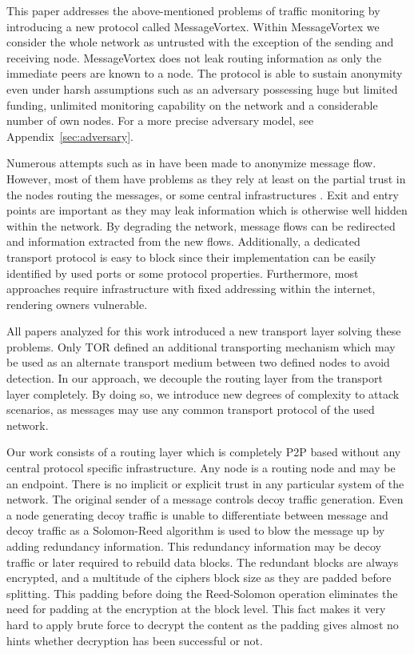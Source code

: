 \documentclass[runningheads]{llncs}
\begin{document}
This paper addresses the above-mentioned problems of traffic monitoring by introducing a new  protocol called MessageVortex. Within MessageVortex we consider the whole network as untrusted with the exception of the sending and receiving node. MessageVortex does not leak routing information as only the immediate peers are known to a node. The protocol is able to sustain anonymity\cite{anon_terminology} even under harsh assumptions such as an adversary possessing huge but limited funding, unlimited monitoring capability on the network and a considerable number of own nodes. For a more precise adversary model, see Appendix~\ref{sec:adversary}.

Numerous attempts such as in \cite{minion-design,babel,mixmaster-spec,tor-design,freehaven-berk,herbivore:tr} have been made to anonymize message flow. However, most of them have problems as they rely at least on the partial trust in the nodes routing the messages, or some central infrastructures \cite{hs-attack06,esorics13-cellflood,esorics12-torscan,oakland2013-trawling}. Exit and entry points are important as they may leak information which is otherwise well hidden within the network. By degrading the network, message flows can be redirected and information extracted from the new flows. Additionally, a dedicated transport protocol is easy to block since their implementation can be easily identified by used ports or some protocol properties. Furthermore, most approaches require infrastructure with fixed addressing within the internet, rendering owners vulnerable.

All papers analyzed for this work introduced a new transport layer solving these problems. Only TOR defined an additional transporting mechanism which may be used as an alternate transport medium between two defined nodes to avoid detection. In our approach, we decouple the routing layer from the transport layer completely. By doing so, we introduce new degrees of complexity to attack scenarios, as messages may use any common transport protocol of the used network. 

Our work consists of a routing layer which is completely P2P based without any central protocol specific infrastructure. Any node is a routing node and may be an endpoint. There is no implicit or explicit trust in any particular system of the  network. The original sender of a message controls decoy traffic generation. Even a node generating decoy traffic is unable to differentiate between message and decoy traffic as a Solomon-Reed algorithm is used to blow the message up by adding redundancy information. This redundancy information may be decoy traffic or later required to rebuild data blocks. The redundant blocks are always encrypted, and a multitude of the ciphers block size as they are padded before splitting. This padding before doing the Reed-Solomon operation eliminates the need for padding at the encryption at the block level. This fact makes it very hard to apply brute force to decrypt the content as the padding gives almost no hints whether decryption has been successful or not.
\end{document}
